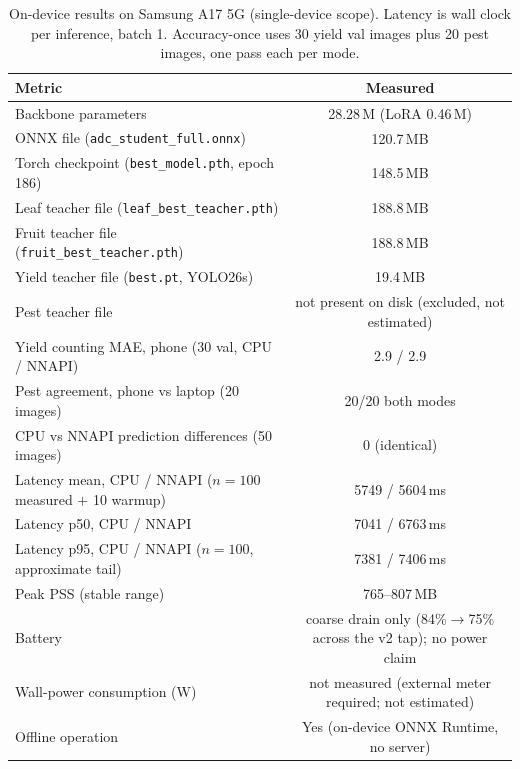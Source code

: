 \documentclass[preprint,12pt]{elsarticle}
\begin{document}
\begin{table}[H]
\centering
\caption{On-device results on Samsung A17 5G (single-device scope).
Latency is wall clock per inference, batch 1. Accuracy-once uses 30
yield val images plus 20 pest images, one pass each per mode.}
\label{tab:edge}
\begin{tabular}{lc}
\toprule
\textbf{Metric}
&
\textbf{Measured}
\\
\midrule

Backbone parameters
& 28.28\,M (LoRA 0.46\,M)
\\

ONNX file (\texttt{adc\_student\_full.onnx})
& 120.7\,MB
\\

Torch checkpoint (\texttt{best\_model.pth}, epoch 186)
& 148.5\,MB
\\

Leaf teacher file (\texttt{leaf\_best\_teacher.pth})
& 188.8\,MB
\\

Fruit teacher file (\texttt{fruit\_best\_teacher.pth})
& 188.8\,MB
\\

Yield teacher file (\texttt{best.pt}, YOLO26s)
& 19.4\,MB
\\

Pest teacher file
& not present on disk (excluded, not estimated)
\\

Yield counting MAE, phone (30 val, CPU / NNAPI)
& 2.9 / 2.9
\\

Pest agreement, phone vs laptop (20 images)
& 20/20 both modes
\\

CPU vs NNAPI prediction differences (50 images)
& 0 (identical)
\\

Latency mean, CPU / NNAPI ($n{=}100$ measured $+$ 10 warmup)
& 5749 / 5604\,ms
\\

Latency p50, CPU / NNAPI
& 7041 / 6763\,ms
\\

Latency p95, CPU / NNAPI ($n{=}100$, approximate tail)
& 7381 / 7406\,ms
\\

Peak PSS (stable range)
& 765--807\,MB
\\

Battery
& coarse drain only (84\%$\rightarrow$75\% across the v2 tap); no power claim
\\

Wall-power consumption (W)
& not measured (external meter required; not estimated)
\\

Offline operation
& Yes (on-device ONNX Runtime, no server)
\\

\bottomrule
\end{tabular}
\end{table}
\end{document}
